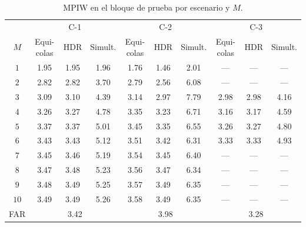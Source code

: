 \begin{table}[H]
\centering\footnotesize
\setlength{\tabcolsep}{4pt}
\caption{MPIW en el bloque de prueba por escenario y $M$.}
\label{tab:res_bloqueB_mpiw_por_M}
\begin{tabular}{c ccc ccc ccc}
\hline
 & \multicolumn{3}{c}{C-1} & \multicolumn{3}{c}{C-2} & \multicolumn{3}{c}{C-3} \\
$M$ & Equi-colas & HDR & Simult. & Equi-colas & HDR & Simult. & Equi-colas & HDR & Simult. \\
\hline
$1$ & 1.95 & 1.95 & 1.96 & 1.76 & 1.46 & 2.01 & --- & --- & --- \\
$2$ & 2.82 & 2.82 & 3.70 & 2.79 & 2.56 & 6.08 & --- & --- & --- \\
$3$ & 3.09 & 3.10 & 4.39 & 3.14 & 2.97 & 7.79 & 2.98 & 2.98 & 4.16 \\
$4$ & 3.26 & 3.27 & 4.78 & 3.35 & 3.23 & 6.71 & 3.16 & 3.17 & 4.59 \\
$5$ & 3.37 & 3.37 & 5.01 & 3.45 & 3.35 & 6.55 & 3.26 & 3.27 & 4.80 \\
$6$ & 3.43 & 3.43 & 5.12 & 3.51 & 3.42 & 6.31 & 3.33 & 3.33 & 4.93 \\
$7$ & 3.45 & 3.46 & 5.19 & 3.54 & 3.45 & 6.40 & --- & --- & --- \\
$8$ & 3.47 & 3.48 & 5.23 & 3.56 & 3.47 & 6.34 & --- & --- & --- \\
$9$ & 3.48 & 3.49 & 5.25 & 3.57 & 3.49 & 6.35 & --- & --- & --- \\
$10$ & 3.49 & 3.49 & 5.26 & 3.58 & 3.49 & 6.35 & --- & --- & --- \\
\hline
FAR & \multicolumn{3}{c}{3.42} & \multicolumn{3}{c}{3.98} & \multicolumn{3}{c}{3.28} \\
\hline
\end{tabular}
\end{table}

